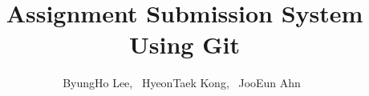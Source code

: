\documentclass[10pt,journal,compsoc]{IEEEtran}
\begin{document}
\title{Assignment Submission System Using Git}

\author{ByungHo Lee,~\IEEEmembership{}
        HyeonTaek Kong,~\IEEEmembership{}
        JooEun Ahn~\IEEEmembership{}}%



% 
%



% 





\end{document}
